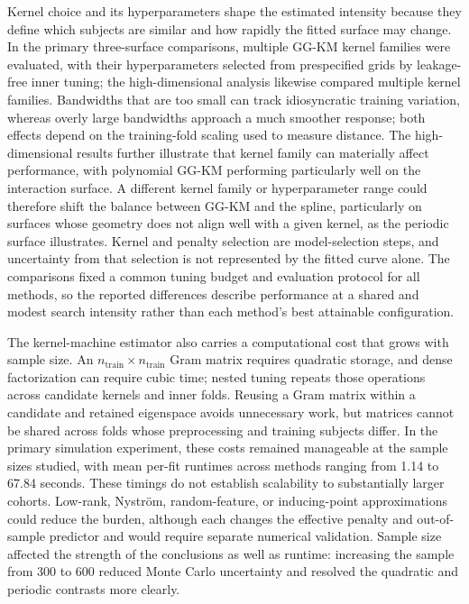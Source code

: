 Kernel choice and its hyperparameters shape the estimated intensity because they define which subjects are similar
and how rapidly the fitted surface may change. In the primary three-surface comparisons, multiple GG-KM kernel
families were evaluated, with their hyperparameters selected from prespecified grids by leakage-free inner tuning;
the high-dimensional analysis likewise compared multiple kernel families. Bandwidths that are too small can track
idiosyncratic training variation, whereas overly large bandwidths approach a much smoother response; both effects
depend on the training-fold scaling used to measure distance. The high-dimensional results further illustrate that
kernel family can materially affect performance, with polynomial GG-KM performing particularly well on the
interaction surface. A different kernel family or hyperparameter range could therefore shift the balance between
GG-KM and the spline, particularly on surfaces whose geometry does not align well with a given kernel, as the
periodic surface illustrates. Kernel and penalty selection are model-selection steps, and uncertainty from that
selection is not represented by the fitted curve alone. The comparisons fixed a common tuning budget and evaluation
protocol for all methods, so the reported differences describe performance at a shared and modest search intensity
rather than each method's best attainable configuration.

The kernel-machine estimator also carries a computational cost that grows with sample size. An
$n_{\mathrm{train}}\times n_{\mathrm{train}}$ Gram matrix requires quadratic storage, and dense
factorization can require cubic time; nested tuning repeats those operations across candidate kernels and
inner folds. Reusing a Gram matrix within a candidate and retained eigenspace avoids unnecessary work, but
matrices cannot be shared across folds whose preprocessing and training subjects differ. In the primary
simulation experiment, these costs remained manageable at the sample sizes studied, with mean per-fit
runtimes across methods ranging from 1.14 to 67.84 seconds. These timings do not establish scalability to substantially larger cohorts.
Low-rank, Nystr\"om, random-feature, or inducing-point approximations could reduce the burden, although each
changes the effective penalty and out-of-sample predictor and would require separate numerical validation.
Sample size affected the strength of the conclusions as well as runtime: increasing the sample from 300 to
600 reduced Monte Carlo uncertainty and resolved the quadratic and periodic contrasts more clearly.

